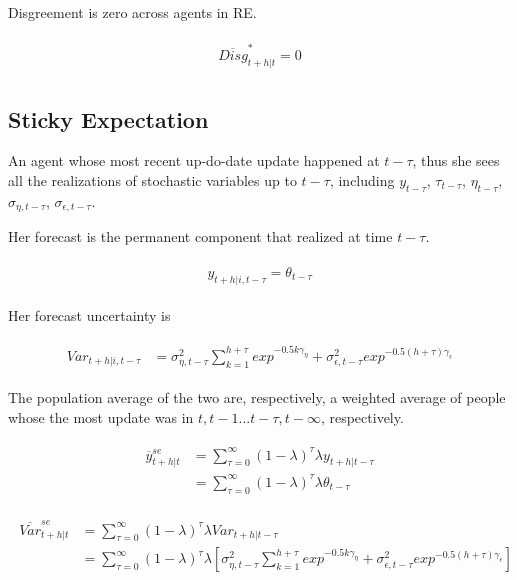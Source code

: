 \documentclass[]{article}
\begin{document}
Disgreement is zero across agents in RE.


\begin{eqnarray}
\begin{split}
\overline{Disg}^*_{t+h|t} =  0 
\end{split} 
\end{eqnarray}

\subsection{Sticky Expectation}

An agent whose most recent up-do-date update happened at $t-\tau$, thus she sees all the realizations of stochastic variables up to $t-\tau$, including $y_{t-\tau}$, $\tau_{t-\tau}$, $\eta_{t-\tau}$, $\sigma_{\eta,t-\tau}$, $\sigma_{\epsilon,t-\tau}$. 

Her forecast is the permanent component that realized at time $t-\tau$. 

\begin{eqnarray}
\begin{split}
y_{t+h|i,t-\tau}  = \theta_{t-\tau} 
\end{split}
\end{eqnarray}

Her forecast uncertainty is 


\begin{eqnarray}
\begin{split}
Var_{t+h|i,t-\tau} & = \sigma^2_{\eta,t-\tau} \sum^{h+\tau}_{k=1} exp^{- 0.5k\gamma_{\eta}} +  \sigma^2_{\epsilon,t-\tau} exp^{- 0.5(h+\tau)\gamma_{\epsilon}}
\end{split} 
\end{eqnarray}

The population average of the two are, respectively, a weighted average of people whose the most update was in $t, t-1... t-\tau, t-\infty$, respectively. 


\begin{eqnarray}
\begin{split}
\overline y^{se}_{t+h|t} & = \sum^{\infty}_{\tau=0} (1-\lambda)^\tau\lambda y_{t+h|t-\tau} \\
& = \sum^{\infty}_{\tau=0} (1-\lambda)^\tau\lambda \theta_{t-\tau}
\end{split} 
\end{eqnarray}



\begin{eqnarray}
\begin{split}
\overline {Var}^{se}_{t+h|t} & = \sum^{\infty}_{\tau=0} (1-\lambda)^\tau\lambda Var_{t+h|t-\tau} \\
& = \sum^{\infty}_{\tau=0} (1-\lambda)^\tau\lambda [ \sigma^2_{\eta,t-\tau} \sum^{h+\tau}_{k=1} exp^{- 0.5k\gamma_{\eta}} +  \sigma^2_{\epsilon,t-\tau} exp^{- 0.5(h+\tau)\gamma_{\epsilon}}]
\end{split} 
\end{eqnarray}
\end{document}

